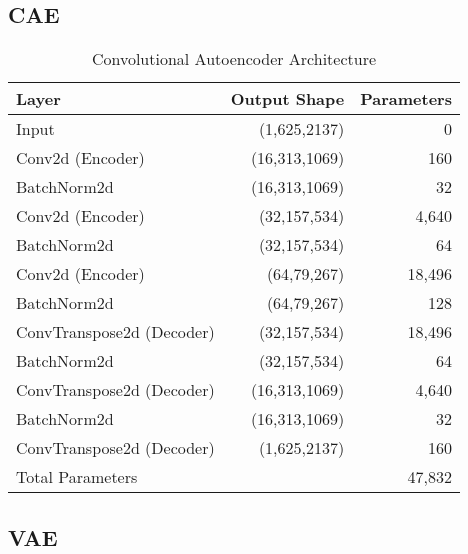 \subsection{CAE}
\label{app:a-cae}

\begin{table}[!h]
    \centering
    \begin{tabular}{lrr}
        \toprule
        Layer & Output Shape & Parameters \\
        \midrule
        Input & (1,625,2137) & 0 \\
        Conv2d (Encoder) & (16,313,1069) & 160 \\
        BatchNorm2d & (16,313,1069) & 32 \\
        Conv2d (Encoder) & (32,157,534) & 4,640 \\
        BatchNorm2d & (32,157,534) & 64 \\
        Conv2d (Encoder) & (64,79,267) & 18,496 \\
        BatchNorm2d & (64,79,267) & 128 \\
        ConvTranspose2d (Decoder) & (32,157,534) & 18,496 \\
        BatchNorm2d & (32,157,534) & 64 \\
        ConvTranspose2d (Decoder) & (16,313,1069) & 4,640 \\
        BatchNorm2d & (16,313,1069) & 32 \\
        ConvTranspose2d (Decoder) & (1,625,2137) & 160 \\
        \midrule
        Total Parameters & & 47,832 \\
        \bottomrule
    \end{tabular}
    \caption{Convolutional Autoencoder Architecture}
    \label{tab:cae}
\end{table}


\subsection{VAE}
\label{app:a-vae}


